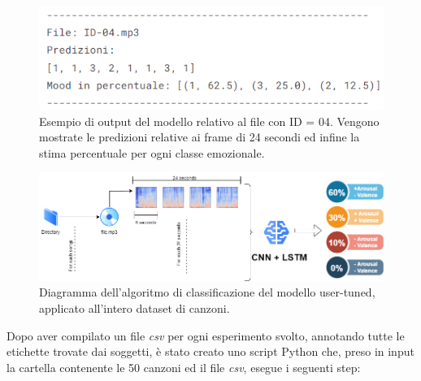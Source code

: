 \documentclass[11pt]{report}
\begin{document}
\begin{figure}[h]
\centering
\includegraphics[scale = 0.9]{img/user-tuning-prediction.PNG}
\caption{Esempio di output del modello relativo al file con ID = 04. Vengono mostrate le predizioni relative ai frame di 24 secondi ed infine la stima percentuale per ogni classe emozionale.}
\label{fig:prediction-user-tuning}
\end{figure}


\newpage

\begin{figure}
\centering
\includegraphics[scale = 0.5]{img/evaluation.png}
\caption{Diagramma dell'algoritmo di classificazione del modello user-tuned, applicato all'intero dataset di canzoni.}
\label{fig-user-evaluation}
\end{figure}

\vspace{1cm}

Dopo aver compilato un file \textit{csv} per ogni esperimento svolto, annotando tutte le etichette trovate dai soggetti, è stato creato uno script Python che, preso in input la cartella contenente le 50 canzoni ed il file \textit{csv}, esegue i seguenti step:
\end{document}
